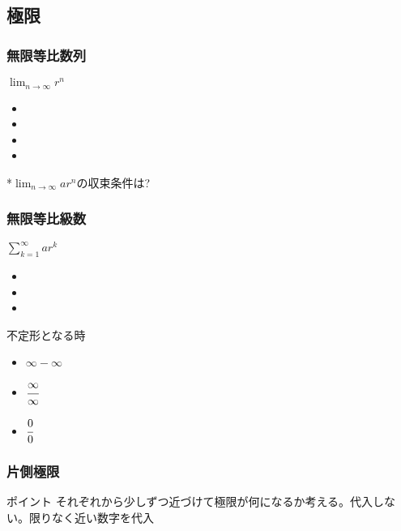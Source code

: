 \documentclass[10pt,dvipdfmx]{jsarticle}
\newcommand{\answer}[2]{{\color{orange}#2}}
\newcommand{\answer}[2]{\vspace{#1mm}}
\begin{document}
\newpage
\subsection*{極限}

\subsubsection*{無限等比数列}
$\lim_{n\rightarrow\infty}r^n$
\begin{Large}
  \begin{itemize}
    \item \item \item \item
  \end{itemize}
\end{Large}
*$\lim_{n\rightarrow\infty}ar^n$の収束条件は?

\subsubsection*{無限等比級数}
$\sum_{k=1}^{\infty}ar^k$
\begin{Large}
  \begin{itemize}
    \item \item \item
  \end{itemize}
\end{Large}

\begin{itembox}[l]{不定形となる時}
  \begin{Large}
    \begin{itemize}
      \item \answer{0}{$\infty-\infty$}
      \item \answer{0}{$\cfrac{\infty}{\infty}$}
      \item \answer{0}{$\cfrac{0}{0}$}
    \end{itemize}
  \end{Large}
\end{itembox}

\subsubsection*{片側極限}
\begin{itembox}[l]{ポイント}
  \answer{15}{それぞれから少しずつ近づけて極限が何になるか考える。代入しない。限りなく近い数字を代入}
\end{itembox}
\end{document}
